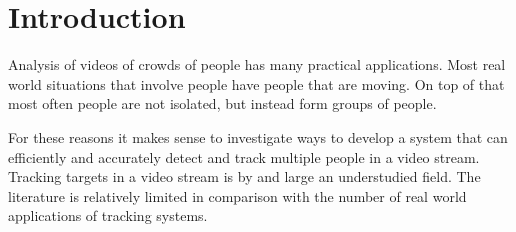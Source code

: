 \section{Introduction}
  Analysis of videos of crowds of people has many practical applications.
  Most real world situations that involve people have people that are moving.
  On top of that most often people are not isolated, but instead form groups of people.

  For these reasons it makes sense to investigate ways to develop a system that can efficiently and accurately detect and track multiple people in a video stream.
  Tracking targets in a video stream is by and large an understudied field.
  The literature is relatively limited in comparison with the number of real world applications of tracking systems.
